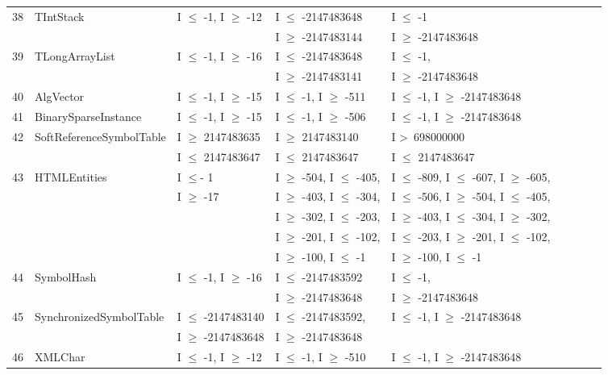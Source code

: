 {\begin{longtable}{|l|l|l|l|l|l|l|l|l|}
38	& TIntStack					& I $\le$ -1, I $\ge$ -12			& I $\le$ -2147483648		 	& I $\le$ -1 							\\ 
	&							&								& I $\ge$ -2147483144			& I $\ge$ -2147483648				\\
39	& TLongArrayList				& I $\le$ -1, I $\ge$ -16			& I $\le$ -2147483648 			& I $\le$ -1, 							\\ 
	&							&								& I $\ge$ -2147483141			& I $\ge$ -2147483648				\\
40	& AlgVector					& I $\le$ -1, I $\ge$ -15			& I $\le$ -1, I $\ge$ -511			& I $\le$ -1, I $\ge$ -2147483648	\\ 
41	& BinarySparseInstance		& I $\le$ -1, I $\ge$ -15			& I $\le$ -1, I $\ge$ -506			& I $\le$ -1, I $\ge$ -2147483648	\\ 
42	& SoftReferenceSymbolTable	& I $\ge$ 2147483635			& I $\ge$ 2147483140			& I \textgreater~698000000					\\ 
	&                                             & I $\le$ 2147483647			& I $\le$ 2147483647			& I $\le$ 2147483647					\\
43	& HTMLEntities				& I $\le$- 1						& I $\ge$ -504, I $\le$ -405,		& I $\le$ -809, I $\le$ -607, I $\ge$ -605,    		\\ 
	&                         			& I $\ge$ -17					& I $\ge$ -403, I $\le$ -304, 		& I $\le$ -506, I $\ge$ -504, I $\le$ -405,		 \\	
	&                         			& 								& I $\ge$ -302, I $\le$ -203,		& I $\ge$ -403, I $\le$ -304, I $\ge$ -302,		 \\	
	&                        				& 								& I $\ge$ -201, I $\le$ -102, 		& I $\le$ -203, I $\ge$ -201, I $\le$ -102,		 \\	
	&                         			& 								& I $\ge$ -100, I $\le$ -1			& I $\ge$ -100, I $\le$ -1				 			 \\	
44	& SymbolHash				& I $\le$ -1,  I $\ge$ -16			& I $\le$ -2147483592			& I $\le$ -1, 							\\ 
	&							&								& I $\ge$ -2147483648			& I $\ge$ -2147483648				\\
45	& SynchronizedSymbolTable	& I $\le$ -2147483140			& I $\le$ -2147483592,			& I $\le$ -1, I $\ge$ -2147483648	\\ 
	&                                             & I $\ge$ -2147483648			& I $\ge$ -2147483648 			&  			   								\\
46	& XMLChar					& I $\le$ -1, I $\ge$ -12			& I $\le$ -1, I $\ge$ -510			& I $\le$ -1, I $\ge$ -2147483648	\\

\end{longtable}}
